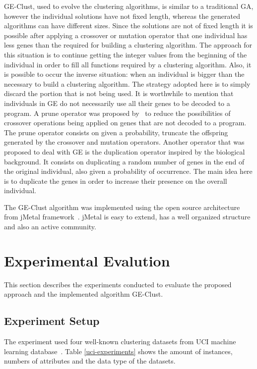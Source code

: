 \documentclass[conference,compsoc]{IEEEtran}
\begin{document}
GE-Clust, used to evolve the clustering algorithms, is similar to a traditional GA, however the individual solutions have not fixed length, whereas the generated algorithms can have different sizes. Since the solutions are not of fixed length it is possible after applying a crossover or mutation operator that one individual has less genes than the required for building a clustering algorithm. The approach for this situation is to continue getting the integer values from the beginning of the individual in order to fill all functions required by a clustering algorithm. Also, it is possible to occur the inverse situation: when an individual is bigger than the necessary to build a clustering algorithm. The strategy adopted here is to simply discard the portion that is not being used. It is worthwhile to mention that individuals in GE do not necessarily use all their genes to be decoded to a program. A prune operator was proposed by~\cite{ryan1998grammatical} to reduce the possibilities of crossover operations being applied on genes that are not decoded to a program. The prune operator consists on given a probability, truncate the offspring generated by the crossover and mutation operators. Another operator that was proposed to deal with GE is the duplication operator inspired by the biological background. It consists on duplicating a random number of genes in the end of the original individual, also given a probability of occurrence. The main idea here is to duplicate the genes in order to increase their presence on the overall individual.

The GE-Clust algorithm was implemented using the open source architecture from jMetal framework~\cite{jMetal}. jMetal is  easy to extend, has a well organized structure and also an active community.  



\section{Experimental Evalution} \label{sec:experiments}

This section describes the experiments conducted to evaluate the proposed approach and the implemented algorithm GE-Clust.

\subsection{Experiment Setup}


The experiment used four well-known clustering datasets from UCI machine learning database~\cite{uci}. Table \ref{uci-experiments} shows the amount of instances, numbers of attributes and the data type of the datasets. 
\end{document}
